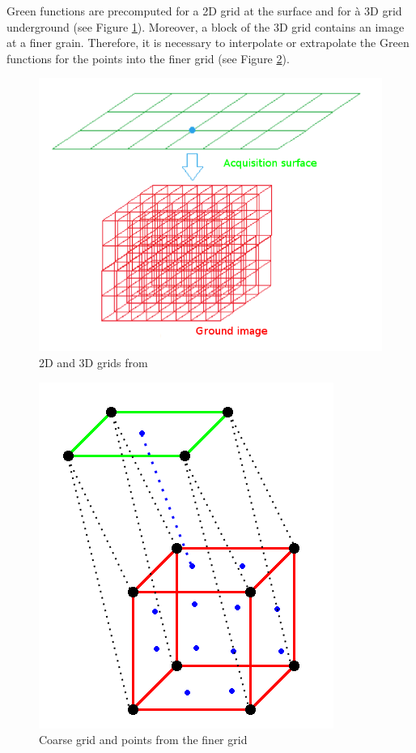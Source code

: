 Green functions are precomputed for a 2D grid at the surface and for à 3D grid underground (see Figure \ref{fig:grids}).
Moreover, a block of the 3D grid contains an image at a finer grain.
Therefore, it is necessary to interpolate or extrapolate the Green functions for the points into the finer grid (see Figure \ref{fig:fine_coarse_grid}).

\begin{figure}[H]
	\centering
	\includegraphics[width=.55\textwidth]{figure8rapportP2}
	\caption{2D and 3D grids \label{fig:grids} from \cite{rapport_Total_Petiton}}
\end{figure}

\begin{figure}[H]
	\centering
	\includegraphics[width=.55\textwidth]{fctGreenInterpolation}
	\caption{Coarse grid and points from the finer grid \label{fig:fine_coarse_grid}}
\end{figure}

